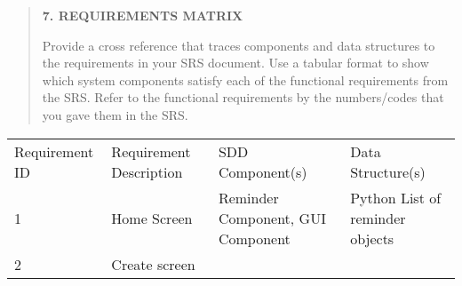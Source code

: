 \documentclass[
]{article}
\begin{document}
\begin{quote}
\textbf{7. REQUIREMENTS MATRIX}

Provide a cross reference that traces components and data structures to
the requirements in your SRS document. Use a tabular format to show
which system components satisfy each of the functional requirements from
the SRS. Refer to the functional requirements by the numbers/codes that
you gave them in the SRS.
\end{quote}

\begin{longtable}[]{@{}
  >{\raggedright\arraybackslash}p{}
  >{\raggedright\arraybackslash}p{}
  >{\raggedright\arraybackslash}p{}
  >{\raggedright\arraybackslash}p{}@{}}
\toprule\noalign{}
\begin{minipage}[b]{\linewidth}\raggedright
Requirement ID
\end{minipage} & \begin{minipage}[b]{\linewidth}\raggedright
Requirement Description
\end{minipage} & \begin{minipage}[b]{\linewidth}\raggedright
SDD Component(s)
\end{minipage} & \begin{minipage}[b]{\linewidth}\raggedright
Data Structure(s)
\end{minipage} \\
\begin{minipage}[b]{\linewidth}\raggedright
1
\end{minipage} & \begin{minipage}[b]{\linewidth}\raggedright
Home Screen
\end{minipage} & \begin{minipage}[b]{\linewidth}\raggedright
Reminder Component, GUI Component
\end{minipage} & \begin{minipage}[b]{\linewidth}\raggedright
Python List of reminder objects
\end{minipage} \\
\begin{minipage}[b]{\linewidth}\raggedright
2
\end{minipage} & \begin{minipage}[b]{\linewidth}\raggedright
Create screen
\end{minipage} & \begin{minipage}[b]{\linewidth}\raggedright

\end{minipage}
\end{longtable}
\end{document}
